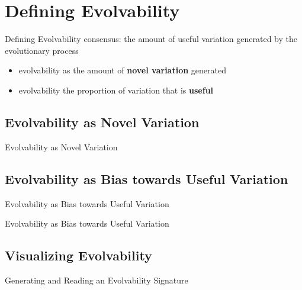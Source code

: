 \section{Defining Evolvability}

\begin{frame}{Defining Evolvability}
consensus: the amount of \textcolor{h2}{useful} \textcolor{h1}{variation} generated by the evolutionary process
\begin{itemize}
  \item evolvability as the amount of \textcolor{h1}{\textbf{novel variation}} generated
  \item evolvability the proportion of variation that is \textcolor{h2}{\textbf{useful}}
\end{itemize}
\end{frame}



\subsection{Evolvability as Novel Variation}

\begin{frame}{Evolvability as Novel Variation}
	
\end{frame}

\subsection{Evolvability as Bias towards Useful Variation}

\begin{frame}{Evolvability as Bias towards Useful Variation}
  
\end{frame}

\begin{frame}{Evolvability as Bias towards Useful Variation}
  
\end{frame}

\subsection{Visualizing Evolvability}

\begin{frame}{Generating and Reading an Evolvability Signature}
  
\end{frame}

